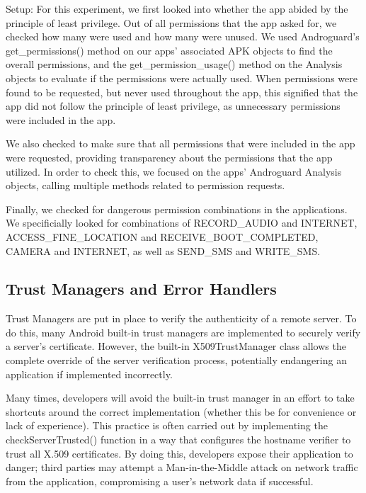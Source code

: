         
        Setup: For this experiment, we first looked into whether the app abided by the 
        principle  of least privilege. Out of all permissions that the app asked 
        for, we checked how many were used and how many were unused. We used 
        Androguard's get\_permissions() method on our apps' associated APK 
        objects to find the overall permissions, and the get\_permission\_usage() method on 
        the Analysis objects to evaluate if the permissions were actually used.  When permissions 
        were found to be requested, but never used throughout the app, this signified
        that the app did not follow the principle of least privilege, as unnecessary 
        permissions were included in the app. 

        We also checked to make sure that all permissions that were included in the app
        were requested, providing transparency about the permissions that the app 
        utilized. In order to check this, we focused on the apps' Androguard Analysis objects, 
        calling multiple methods related to permission requests. 

        Finally, we checked for dangerous permission combinations in the applications. 
        We specificially looked for combinations of RECORD\_AUDIO and 
        INTERNET, ACCESS\_FINE\_LOCATION and RECEIVE\_BOOT\_COMPLETED, CAMERA and 
        INTERNET, as well as SEND\_SMS and WRITE\_SMS. 

    \subsection{Trust Managers and Error Handlers}

        Trust Managers are put in place to verify the authenticity of a 
        remote server. To do this, many Android built-in trust managers 
        are implemented to securely verify a server's certificate.
        However, the built-in X509TrustManager class allows the complete 
        override of the server verification process, potentially endangering
        an application if implemented incorrectly.

        Many times, developers will avoid the built-in trust manager in an
        effort to take shortcuts around the correct implementation (whether
        this be for convenience or lack of experience). This practice is often
        carried out by implementing the checkServerTrusted() function in a way 
        that configures the hostname verifier to trust all X.509 certificates. 
        By doing this, developers expose their application to danger;
        third parties may attempt a Man-in-the-Middle attack on network traffic
        from the application, compromising a user's network data if successful.


